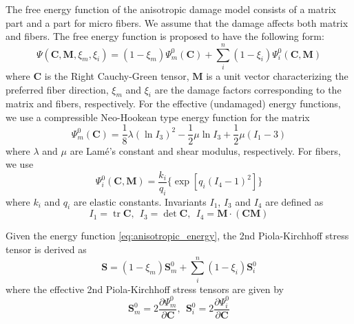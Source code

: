 \documentclass[12pt]{article}
\DeclareMathOperator{\tr}{tr}
\newcommand{\tensor}[1]{\ensuremath{\boldsymbol{#1}}}
\numberwithin{equation}{section}
\begin{document}
The free energy function of the anisotropic damage model consists of a
matrix part and a part for micro fibers. We assume that the damage
affects both matrix and fibers. The free energy function is proposed
to have the following form:
\begin{equation}\label{eq:anisotropic_energy}
  \Psi (\tensor C, \tensor M, \xi_m, \xi_i) = (1-\xi_m) \Psi_m^0(\tensor C) + \sum_{i}^{n} (1-\xi_i)\Psi_i^0(\tensor C, \tensor M)
\end{equation}
where $\tensor C$ is the Right Cauchy-Green tensor, $\tensor M$ is a
unit vector characterizing the preferred fiber direction, $\xi_m$ and
$\xi_i$ are the damage factors corresponding to the matrix and fibers,
respectively. For the effective (undamaged) energy functions, we use a
compressible Neo-Hookean type energy function for the matrix
\begin{equation}\label{eq:Psim0}
  \Psi_m^0 (\tensor C) = \frac{1}{8}\lambda (\ln I_3)^2 - \frac{1}{2}\mu \ln I_3 + \frac{1}{2}\mu( I_1 - 3)
\end{equation}
where $\lambda$ and $\mu$ are Lam\'{e}'s constant and shear modulus,
respectively.  For fibers, we use
\begin{equation}
  \Psi_i^0(\tensor C, \tensor M) = \frac{k_i}{q_i}\{ \exp[q_i(I_4 - 1)^2] \}
\end{equation}
where $k_i$ and $q_i$ are elastic constants. Invariants $I_1$, $I_3$
and $I_4$ are defined as
\begin{equation}
  I_1 = \tr \tensor C, ~~ I_3 = \det \tensor C,~~I_4 = \tensor M\cdot (\tensor C \tensor M)
\end{equation}

Given the energy function \eqref{eq:anisotropic_energy}, the 2nd
Piola-Kirchhoff stress tensor is derived as
\begin{equation}\label{eq:aniso_S}
  \tensor S = (1-\xi_m)\tensor S_m^0+ \sum_i^n (1-\xi_i)\tensor S_i^0 
\end{equation}
where the effective 2nd Piola-Kirchhoff stress tensors are given by
\begin{equation}\label{eq:aniso_S0}
  \tensor S_m^0 = 2\frac{\partial\Psi_m^0}{\partial\tensor C} ,~~ \tensor S_i^0 = 2 \frac{\partial\Psi_i^0}{\partial\tensor C} 
\end{equation}
\end{document}
